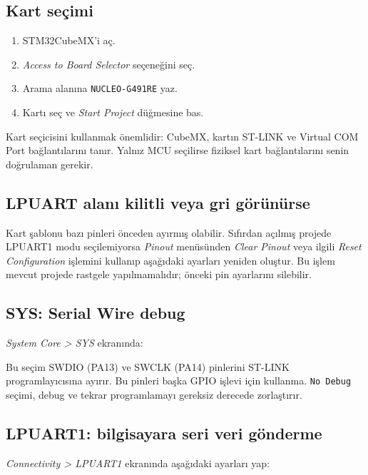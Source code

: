 \documentclass[11pt,a4paper]{article}
\begin{document}
\subsection{Kart seçimi}
\begin{enumerate}
  \item STM32CubeMX'i aç.
  \item \textit{Access to Board Selector} seçeneğini seç.
  \item Arama alanına \texttt{NUCLEO-G491RE} yaz.
  \item Kartı seç ve \textit{Start Project} düğmesine bas.
\end{enumerate}

Kart seçicisini kullanmak önemlidir: CubeMX, kartın ST-LINK ve Virtual COM Port
bağlantılarını tanır. Yalnız MCU seçilirse fiziksel kart bağlantılarını senin
doğrulaman gerekir.

\subsection{LPUART alanı kilitli veya gri görünürse}

Kart şablonu bazı pinleri önceden ayırmış olabilir. Sıfırdan açılmış projede
LPUART1 modu seçilemiyorsa \textit{Pinout} menüsünden \textit{Clear Pinout} veya
ilgili \textit{Reset Configuration} işlemini kullanıp aşağıdaki ayarları yeniden
oluştur. Bu işlem mevcut projede rastgele yapılmamalıdır; önceki pin ayarlarını
silebilir.

\subsection{SYS: Serial Wire debug}

\textit{System Core > SYS} ekranında:

\begin{center}
\end{center}

Bu seçim SWDIO (PA13) ve SWCLK (PA14) pinlerini ST-LINK programlayıcısına ayırır.
Bu pinleri başka GPIO işlevi için kullanma. \texttt{No Debug} seçimi, debug ve
tekrar programlamayı gereksiz derecede zorlaştırır.

\subsection{LPUART1: bilgisayara seri veri gönderme}

\textit{Connectivity > LPUART1} ekranında aşağıdaki ayarları yap:
\end{document}
